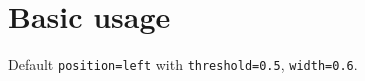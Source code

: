 \documentclass{article}
\begin{document}
\section*{Basic usage}

Default \texttt{position=left} with \texttt{threshold=0.5},
\texttt{width=0.6\string\textwidth}.

\lipsum[1-8]
\end{document}
